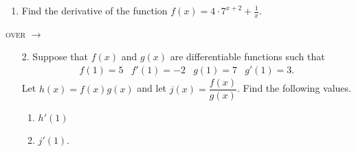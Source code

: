 \documentclass[11pt]{article}
\begin{document}
\pagestyle{empty}
\newsavebox{\quizfront}
\begin{lrbox}{\quizfront}
\begin{minipage}[top][4.5in][t]{\textwidth} \setlength{\parindent}{1.5em}
\drawtitle
\vspace{-0.5in}
\begin{enumerate}

\item Find the derivative of the function $\displaystyle f(x)=4\cdot
  7^{x+2}+\frac{1}{x}$.

  \vfill

\end{enumerate}

\hfill \textsc{over} $\longrightarrow$

\end{minipage}
\end{lrbox}

\newsavebox{\quizback}
\begin{lrbox}{\quizback}
\begin{minipage}[top][4.5in][t]{\textwidth} \setlength{\parindent}{1.5em}
\begin{enumerate}
\item[2.] Suppose that $f(x)$ and $g(x)$ are differentiable functions
  such that
  \[
  \begin{array}{cccc}
    f(1) = 5 & f'(1) = -2 & g(1) = 7 & g'(1) = 3.
  \end{array}
  \]  
  Let $h(x) = f(x) g(x)$ and let $j(x) = \dfrac{f(x)}{g(x)}$. Find the
  following values.
  \begin{enumerate}
  \item $h'(1)$
    \vfill
  \item $j'(1)$.
    \vfill
  \end{enumerate}

\end{enumerate}
\end{minipage}
\end{lrbox}

\noindent \usebox{\quizfront}
\vfill
\noindent \usebox{\quizfront}

\pagebreak
\noindent \usebox{\quizback}
\vfill
\noindent \usebox{\quizback}
\end{document}
